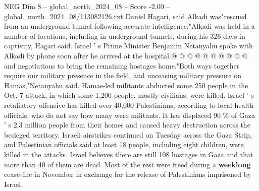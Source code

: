 \begin{textsample}{NEG Dim 8 – global\_north\_2024\_08 – Score -2.00 – global\_north\_2024\_08/113082126.txt}
Daniel Hagari, said Alkadi was"rescued from an underground tunnel following accurate intelligence."Alkadi was held in a number of locations, including in underground tunnels, during his 326 days in captivity, Hagari said.
Israel ' s Prime Minister Benjamin Netanyahu spoke with Alkadi by phone soon after he arrived at the hospital @ @ @ @ @ @ @ @ @ @ and negotiations to bring the remaining hostages home."Both ways together require our military presence in the field, and unceasing military pressure on Hamas,"Netanyahu said.
Hamas-led militants abducted some 250 people in the Oct. 7 attack, in which some 1,200 people, mostly civilians, were killed.
Israel ' s retaliatory offensive has killed over 40,000 Palestinians, according to local health officials, who do not say how many were militants.
It has displaced 90 \% of Gaza ' s 2.3 million people from their homes and caused heavy destruction across the besieged territory.
Israeli airstrikes continued on Tuesday across the Gaza Strip, and Palestinian officials said at least 18 people, including eight children, were killed in the attacks.
Israel believes there are still 108 hostages in Gaza and that more than 40 of them are dead.
Most of the rest were freed during a \textbf{weeklong} cease-fire in November in exchange for the release of Palestinians imprisoned by Israel.

\end{textsample}
